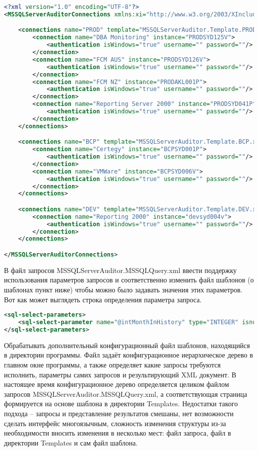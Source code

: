 \documentclass[10pt,a4paper]{article}
\begin{document}
\begin{lstlisting}[language=XML,label=MSSQLServerAuditor.Connections.xml,caption=MSSQLServerAuditor.Connections.xml]
<?xml version="1.0" encoding="UTF-8"?>
<MSSQLServerAuditorConnections xmlns:xi="http://www.w3.org/2003/XInclude" version="1.0">

	<connections name="PROD" template="MSSQLServerAuditor.Template.PROD.xml">
		<connection name="DBA Monitoring" instance="PRODSYD125V">
			<authentication isWindows="true" username="" password=""/>
		</connection>
		<connection name="FCM AUS" instance="PRODSYD126V">
			<authentication isWindows="true" username="" password=""/>
		</connection>
		<connection name="FCM NZ" instance="PRODAKL001P">
			<authentication isWindows="true" username="" password=""/>
		</connection>
		<connection name="Reporting Server 2000" instance="PRODSYD041P">
			<authentication isWindows="true" username="" password=""/>
		</connection>
	</connections>

	<connections name="BCP" template="MSSQLServerAuditor.Template.BCP.xml">
		<connection name="Certegy" instance="BCPSYD001P">
			<authentication isWindows="true" username="" password=""/>
		</connection>
		<connection name="VMWare" instance="BCPSYD006V">
			<authentication isWindows="true" username="" password=""/>
		</connection>
	</connections>

	<connections name="DEV" template="MSSQLServerAuditor.Template.DEV.xml">
		<connection name="Reporting 2000" instance="devsyd004v">
			<authentication isWindows="true" username="" password=""/>
		</connection>
	</connections>

</MSSQLServerAuditorConnections>
\end{lstlisting}

В файл запросов MSSQLServerAuditor.MSSQLQuery.xml ввести поддержку использования
параметров запросов и соответственно изменить файл шаблонов (о шаблонах пункт
ниже) чтобы можно было задавать значения этих параметров. Вот как может
выглядеть строка определения параметра запроса.

\begin{lstlisting}[language=XML,label=MSSQLServerAuditor.MSSQLQuery.xml,caption=MSSQLServerAuditor.MSSQLQuery.xml]
<sql-select-parameters>
	<sql-select-parameter name="@intMonthInHistory" type="INTEGER" isnull="false" default="1"/>
</sql-select-parameters>
\end{lstlisting}

Обрабатывать дополнительный конфигурационный файл шаблонов, находящийся в
директории программы. Файл задаёт конфигурационное иерархическое дерево в
главном окне программы, а также определяет какие запросы требуются исполнить,
параметры самих запросов и результирующий XML документ. В настоящее время
конфигурационное дерево определяется целиком файлом запросов
MSSQLServerAuditor.MSSQLQuery.xml, а соответствующая страница формируется на
основе шаблона в директории Templates. Недостатки такого подхода – запросы и
представление результатов смешаны, нет возможности сделать интерфейс
многоязычным, сложность изменения структуры из-за необходимости вносить
изменения в несколько мест: файл запроса, файл в директории Templates и сам файл
шаблона.
\end{document}
